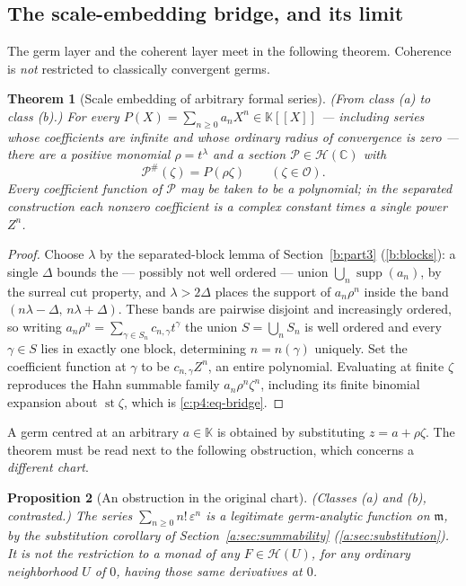 \documentclass[11pt,a4paper]{article}
\numberwithin{equation}{section}
\newtheorem{theorem}{Theorem}[section]
\newtheorem{proposition}[theorem]{Proposition}
\theoremstyle{definition}
\theoremstyle{remark}
\theoremstyle{plain}
\newcommand{\K}{\mathbb K}
\newcommand{\CC}{\mathbb C}
\newcommand{\Ov}{\mathcal O}
\newcommand{\mm}{\mathfrak m}
\DeclareMathOperator{\supp}{supp}
\DeclareMathOperator{\st}{st}
\newcommand{\tm}{t}
\newcommand{\ev}[1]{#1^{\#}}
\newcommand{\Hc}{\mathcal H}
\begin{document}
\subsection{The scale-embedding bridge, and its limit}
\label{c:p4:bridge-sec}

The germ layer and the coherent layer meet in the following theorem.
Coherence is \emph{not} restricted to classically convergent germs.

\begin{theorem}[Scale embedding of arbitrary formal series]
\label{c:p4:bridge}
\emph{(From class (a) to class (b).)} For every
$P(X)=\sum_{n\ge0}a_nX^{n}\in\K[[X]]$ --- including series whose
coefficients are infinite and whose ordinary radius of convergence is
zero --- there are a positive monomial $\rho=\tm^{\lambda}$ and a
section $\mathcal P\in\Hc(\CC)$ with
\begin{equation}\label{c:p4:eq-bridge}
 \ev{\mathcal P}(\zeta)=P(\rho\zeta)\qquad(\zeta\in\Ov).
\end{equation}
Every coefficient function of $\mathcal P$ may be taken to be a
polynomial; in the separated construction each nonzero coefficient is a
complex constant times a single power $Z^{n}$.
\end{theorem}

\begin{proof}
Choose $\lambda$ by the separated-block lemma of Section~\ref{b:part3}
(\ref{b:blocks}): a single $\Delta$ bounds the --- possibly not well
ordered --- union $\bigcup_n\supp(a_n)$, by the surreal cut property,
and $\lambda>2\Delta$ places the support of $a_n\rho^{n}$ inside the
band $(n\lambda-\Delta,\,n\lambda+\Delta)$. These bands are pairwise
disjoint and increasingly ordered, so writing
$a_n\rho^{n}=\sum_{\gamma\in S_n}c_{n,\gamma}\tm^{\gamma}$ the union
$S=\bigcup_nS_n$ is well ordered and every $\gamma\in S$ lies in exactly
one block, determining $n=n(\gamma)$ uniquely. Set the coefficient
function at $\gamma$ to be $c_{n,\gamma}Z^{n}$, an entire polynomial.
Evaluating at finite $\zeta$ reproduces the Hahn summable family
$a_n\rho^{n}\zeta^{n}$, including its finite binomial expansion about
$\st\zeta$, which is \eqref{c:p4:eq-bridge}.
\end{proof}

A germ centred at an arbitrary $a\in\K$ is obtained by substituting
$z=a+\rho\zeta$. The theorem must be read next to the following
obstruction, which concerns a \emph{different chart}.

\begin{proposition}[An obstruction in the original chart]
\label{c:p4:obstruction}
\emph{(Classes (a) and (b), contrasted.)} The series
$\sum_{n\ge0}n!\,\varepsilon^{n}$ is a legitimate germ-analytic function
on $\mm$, by the substitution corollary of Section~\ref{a:sec:summability}
(\ref{a:sec:substitution}). It is \emph{not} the restriction to a monad
of any $F\in\Hc(U)$, for any ordinary neighborhood $U$ of $0$, having
those same derivatives at $0$.
\end{proposition}
\end{document}
